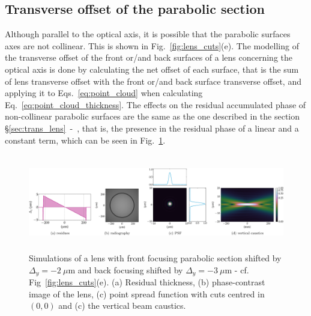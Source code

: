 \begin{refsection}
\subsection{Transverse offset of the parabolic section}

Although parallel to the optical axis, it is possible that the parabolic surfaces axes are not collinear. This is shown in Fig.~\ref{fig:lens_cuts}(e). The modelling of the transverse offset of the front or/and back surfaces of a lens concerning the optical axis is done by calculating the net offset of each surface, that is the sum of lens transverse offset with the front or/and back surface transverse offset, and applying it to Eqs.~\ref{eq:point_cloud} when calculating Eq.~\ref{eq:point_cloud_thickness}. The effects on the residual accumulated phase of non-collinear parabolic surfaces are the same as the one described in the section \S\ref{sec:trans_lens}~-~\textit{}, that is, the presence in the residual phase of a linear and a constant term, which can be seen in Fig.~\ref{fig:offset_fs_CRL}.


\begin{figure}[t]
        \centering
        \includegraphics[height=4.19cm]{figures/ch04/offset_fs_CRL.pdf}
        \caption[Effects of the transverse offset of the parabolic section]{Simulations of a lens with front focusing parabolic section shifted by $\Delta_y=-2~\mu$m and back focusing shifted by $\Delta_y=-3~\mu$m - cf. Fig~\ref{fig:lens_cuts}(e). (a) Residual thickness, (b) phase-contrast image of the lens, (c) point spread function with cuts centred in $(0,0)$ and (c) the vertical beam caustics.} \label{fig:offset_fs_CRL}
\end{figure}


\end{refsection}
